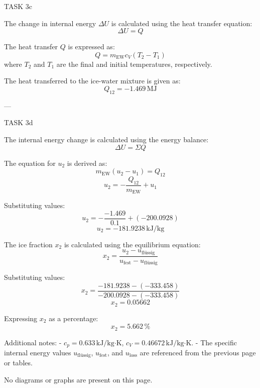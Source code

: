 TASK 3c  

The change in internal energy \( \Delta U \) is calculated using the heat transfer equation:  
\[
\Delta U = Q
\]  

The heat transfer \( Q \) is expressed as:  
\[
Q = m_{\text{EW}} c_V (T_2 - T_1)
\]  
where \( T_2 \) and \( T_1 \) are the final and initial temperatures, respectively.  

The heat transferred to the ice-water mixture is given as:  
\[
Q_{12} = -1.469 \, \text{MJ}
\]  

---

TASK 3d  

The internal energy change is calculated using the energy balance:  
\[
\Delta U = \Sigma Q
\]  

The equation for \( u_2 \) is derived as:  
\[
m_{\text{EW}} (u_2 - u_1) = Q_{12}
\]  
\[
u_2 = -\frac{Q_{12}}{m_{\text{EW}}} + u_1
\]  

Substituting values:  
\[
u_2 = -\frac{-1.469}{0.1} + (-200.0928)
\]  
\[
u_2 = -181.9238 \, \text{kJ/kg}
\]  

The ice fraction \( x_2 \) is calculated using the equilibrium equation:  
\[
x_2 = \frac{u_2 - u_{\text{flüssig}}}{u_{\text{fest}} - u_{\text{flüssig}}}
\]  

Substituting values:  
\[
x_2 = \frac{-181.9238 - (-333.458)}{-200.0928 - (-333.458)}
\]  
\[
x_2 = 0.05662
\]  

Expressing \( x_2 \) as a percentage:  
\[
x_2 = 5.662 \, \%
\]  

Additional notes:  
- \( c_p = 0.633 \, \text{kJ/kg·K} \), \( c_V = 0.46672 \, \text{kJ/kg·K} \).  
- The specific internal energy values \( u_{\text{flüssig}} \), \( u_{\text{fest}} \), and \( u_{\text{loss}} \) are referenced from the previous page or tables.  

No diagrams or graphs are present on this page.